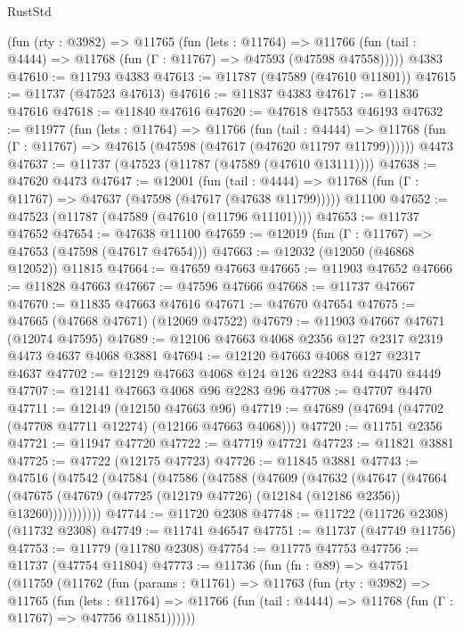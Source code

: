 \begin{lexlean}{RustStd}
\begin{coremodule}
    (fun (rty : @3982) =>
    @11765
      (fun (lets : @11764) =>
      @11766 (fun (tail : @4444) => @11768 (fun (Γ : @11767) => @47593 (@47598 @47558)))))
    @4383
@47610 := @11793 @4383
@47613 := @11787 (@47589 (@47610 @11801))
@47615 := @11737 (@47523 @47613)
@47616 := @11837 @4383
@47617 := @11836 @47616
@47618 := @11840 @47616
@47620 := @47618 @47553 @46193
@47632 := @11977
    (fun (lets : @11764) =>
    @11766
      (fun (tail : @4444) =>
      @11768 (fun (Γ : @11767) => @47615 (@47598 (@47617 (@47620 @11797 @11799))))))
    @4473
@47637 := @11737 (@47523 (@11787 (@47589 (@47610 @13111))))
@47638 := @47620 @4473
@47647 := @12001
    (fun (tail : @4444) => @11768 (fun (Γ : @11767) => @47637 (@47598 (@47617 (@47638 @11799)))))
    @11100
@47652 := @47523 (@11787 (@47589 (@47610 (@11796 @11101))))
@47653 := @11737 @47652
@47654 := @47638 @11100
@47659 := @12019 (fun (Γ : @11767) => @47653 (@47598 (@47617 @47654)))
@47663 := @12032 (@12050 (@46868 @12052)) @11815
@47664 := @47659 @47663
@47665 := @11903 @47652
@47666 := @11828 @47663
@47667 := @47596 @47666
@47668 := @11737 @47667
@47670 := @11835 @47663 @47616
@47671 := @47670 @47654
@47675 := @47665 (@47668 @47671) (@12069 @47522)
@47679 := @11903 @47667 @47671 (@12074 @47595)
@47689 := @12106 @47663 @4068 @2356 @127 @2317 @2319 @4473 @4637 @4068 @3881
@47694 := @12120 @47663 @4068 @127 @2317 @4637
@47702 := @12129 @47663 @4068 @124 @126 @2283 @44 @4470 @4449
@47707 := @12141 @47663 @4068 @96 @2283 @96
@47708 := @47707 @4470
@47711 := @12149 (@12150 @47663 @96)
@47719 := @47689 (@47694 (@47702 (@47708 @47711 @12274) (@12166 @47663 @4068)))
@47720 := @11751 @2356
@47721 := @11947 @47720
@47722 := @47719 @47721
@47723 := @11821 @3881
@47725 := @47722 (@12175 @47723)
@47726 := @11845 @3881
@47743 := @47516
    (@47542
      (@47584
        (@47586
          (@47588
            (@47609
              (@47632
                (@47647
                  (@47664
                    (@47675
                      (@47679 (@47725 (@12179 @47726) (@12184 (@12186 @2356)) @13260)))))))))))
@47744 := @11720 @2308
@47748 := @11722 (@11726 @2308) (@11732 @2308)
@47749 := @11741 @46547
@47751 := @11737 (@47749 @11756)
@47753 := @11779 (@11780 @2308)
@47754 := @11775 @47753
@47756 := @11737 (@47754 @11804)
@47773 := @11736
    (fun (fn : @89) =>
    @47751
      (@11759
        (@11762
          (fun (params : @11761) =>
          @11763
            (fun (rty : @3982) =>
            @11765
              (fun (lets : @11764) =>
              @11766 (fun (tail : @4444) => @11768 (fun (Γ : @11767) => @47756 @11851))))))

\end{coremodule}
\end{lexlean}
